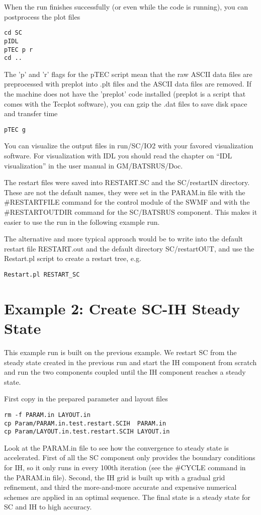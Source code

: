 When the run finishes successfully (or even while the code is running), 
you can postprocess the plot files
\begin{verbatim}
cd SC
pIDL
pTEC p r
cd ..
\end{verbatim}
The 'p' and 'r' flags for the pTEC script mean that the raw ASCII data
files are preprocessed with preplot into .plt files and the ASCII data
files are removed. If the machine does not have the 'preplot' code
installed (preplot is a script that comes with the Tecplot software),
you can gzip the .dat files to save disk space and transfer time
\begin{verbatim}
pTEC g
\end{verbatim}
You can visualize the output files in run/SC/IO2 with your favored 
visualization software. For visualization with IDL you should read the
chapter on ``IDL visualization'' in the user manual in GM/BATSRUS/Doc.

The restart files were saved into RESTART.SC and the SC/restartIN directory.
These are not the default names, they were set in the PARAM.in file with
the \#RESTARTFILE command for the control module of the SWMF and 
with the \#RESTARTOUTDIR command for the SC/BATSRUS component.
This makes it easier to use the run in the following example run.

The alternative and more typical approach would be to write into the
default restart file RESTART.out and the default directory SC/restartOUT,
and use the Restart.pl script to create a restart tree, e.g.
\begin{verbatim}
Restart.pl RESTART_SC
\end{verbatim}

\section{Example 2: Create SC-IH Steady State}

This example run is built on the previous example. We restart SC from the
steady state created in the previous run and start the IH component from 
scratch and run the two components coupled until the IH component reaches
a steady state. 

First copy in the prepared parameter and layout files
\begin{verbatim}
rm -f PARAM.in LAYOUT.in
cp Param/PARAM.in.test.restart.SCIH  PARAM.in
cp Param/LAYOUT.in.test.restart.SCIH LAYOUT.in
\end{verbatim}
Look at the PARAM.in file to see how the convergence to 
steady state is accelerated.
First of all the SC component only provides the boundary conditions for IH,
so it only runs in every 100th iteration (see the \#CYCLE command in
the PARAM.in file). Second, the IH grid is built
up with a gradual grid refinement, and third the 
more-and-more accurate and expensive numerical schemes are 
applied in an optimal sequence. The final state
is a steady state for SC and IH to high accuracy. 

